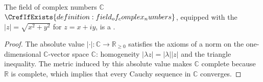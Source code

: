 \begin{proposition}
\label{proposition:C_is_a_Banach_space_over_C_with_the_standard_norm_valued_in_R}
The field of complex numbers $\mathbb{C}$$\CrefIfExists{definition:field_of_complex_numbers}$, equipped with the  $|z| = \sqrt{x^2 + y^2}$ for $z = x + iy$, is a .
\end{proposition}

\begin{proof}
The absolute value $|\cdot| : \mathbb{C} \to \mathbb{R}_{\geq 0}$ satisfies the axioms of a norm on the one-dimensional $\mathbb{C}$-vector space $\mathbb{C}$: homogeneity $|\lambda z| = |\lambda||z|$ and the triangle inequality. The metric induced by this absolute value makes $\mathbb{C}$ complete because $\mathbb{R}$ is complete, which implies that every Cauchy sequence in $\mathbb{C}$ converges.
\end{proof}
